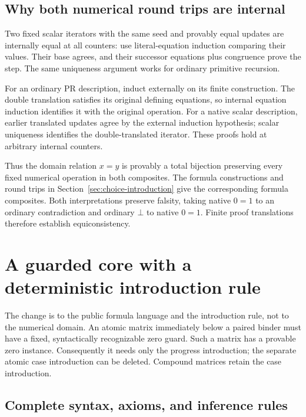 \documentclass[11pt,letterpaper]{article}
\theoremstyle{definition}
\begin{document}
\subsection{Why both numerical round trips are internal}

Two fixed scalar iterators with the same seed and provably equal
updates are internally equal at all counters: use literal-equation
induction comparing their values. Their base agrees, and their
successor equations plus congruence prove the step. The same
uniqueness argument works for ordinary primitive recursion.

For an ordinary PR description, induct externally on its finite
construction. The double translation satisfies its original
defining equations, so internal equation induction identifies it
with the original operation. For a native scalar description,
earlier translated updates agree by the external induction
hypothesis; scalar uniqueness identifies the double-translated
iterator. These proofs hold at arbitrary internal counters.

Thus the domain relation $x=y$ is provably a total bijection
preserving every fixed numerical operation in both composites.
The formula constructions and round trips in
Section~\ref{sec:choice-introduction} give the corresponding formula
composites. Both interpretations preserve falsity, taking native
$0=1$ to an ordinary contradiction and ordinary $\bot$ to native
$0=1$. Finite proof translations therefore establish equiconsistency.



\section{A guarded core with a deterministic introduction rule}
\label{sec:guarded-core}

The change is to the public formula language and the introduction rule,
not to the numerical domain.  An atomic matrix immediately below a
paired binder must have a fixed, syntactically recognizable zero guard.
Such a matrix has a provable zero instance.  Consequently it needs only
the progress introduction; the separate atomic case introduction can
be deleted.  Compound matrices retain the case introduction.

\subsection{Complete syntax, axioms, and inference rules}
\end{document}
